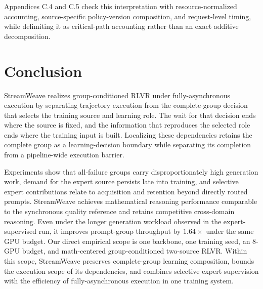\documentclass[letterpaper]{article}
\begin{document}
Appendices C.4 and C.5 check this interpretation with resource-normalized accounting, source-specific policy-version composition, and request-level timing, while delimiting it as critical-path accounting rather than an exact additive decomposition.

\FloatBarrier
\section{Conclusion}
\label{sec:conclusion}

StreamWeave realizes group-conditioned RLVR under fully-asynchronous execution by separating trajectory execution from the complete-group decision that selects the training source and learning role.
The wait for that decision ends where the source is fixed, and the information that reproduces the selected role ends where the training input is built.
Localizing these dependencies retains the complete group as a learning-decision boundary while separating its completion from a pipeline-wide execution barrier.

Experiments show that all-failure groups carry disproportionately high generation work, demand for the expert source persists late into training, and selective expert contributions relate to acquisition and retention beyond directly routed prompts.
StreamWeave achieves mathematical reasoning performance comparable to the synchronous quality reference and retains competitive cross-domain reasoning.
Even under the longer generation workload observed in the expert-supervised run, it improves prompt-group throughput by $1.64\times$ under the same GPU budget.
Our direct empirical scope is one backbone, one training seed, an 8-GPU budget, and math-centered group-conditioned two-source RLVR.
Within this scope, StreamWeave preserves complete-group learning composition, bounds the execution scope of its dependencies, and combines selective expert supervision with the efficiency of fully-asynchronous execution in one training system.


\end{document}

